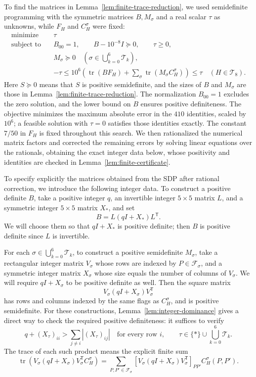 \documentclass[11pt]{article}
\newcommand{\tr}{\operatorname{tr}}
\begin{document}
To find the matrices in Lemma~\ref{lem:finite-trace-reduction}, we used
semidefinite programming with the symmetric matrices $B,M_\sigma$ and a
real scalar $\tau$ as unknowns, while $F_H$ and $C_H^\sigma$ were fixed:
\[
\begin{aligned}
\text{minimize}\quad &\tau\\
\text{subject to}\quad
&B_{00}=1,\qquad B-10^{-8}I\succeq0,\qquad \tau\geq0,\\
&M_\sigma\succeq0
\quad\left(\sigma\in\bigcup_{k=0}^6\mathcal T_k\right),\\
&-\tau\leq10^6\left(\tr(BF_H)
+\sum_\sigma\tr(M_\sigma C_H^\sigma)\right)\leq\tau
\quad(H\in\mathcal T_8).
\end{aligned}
\]
Here $S\succeq0$ means that $S$ is positive semidefinite, and the sizes of
$B$ and $M_\sigma$ are those in Lemma~\ref{lem:finite-trace-reduction}.
The normalization $B_{00}=1$ excludes the zero solution, and the lower
bound on $B$ ensures positive definiteness.
The objective minimizes the maximum absolute error in the $410$ identities,
scaled by $10^6$; a feasible solution with $\tau=0$ satisfies those identities exactly.
The constant $7/50$ in $F_H$ is fixed throughout this search.
We then rationalized the numerical matrix factors and corrected the remaining
errors by solving linear equations over the rationals, obtaining the exact
integer data below, whose positivity and identities are checked in
Lemma~\ref{lem:finite-certificate}.

To specify explicitly the matrices obtained from the SDP after rational
correction, we introduce the following integer data.
To construct a positive definite $B$, take a positive integer $q$, an invertible
integer $5\times5$ matrix $L$, and a symmetric integer $5\times5$ matrix $X_*$,
and set
\[
B=L(qI+X_*)L^{\mathsf T}.
\]
We will choose them so that $qI+X_*$ is positive definite; then $B$ is positive definite since $L$ is invertible.

For each $\sigma\in\bigcup_{k=0}^6\mathcal T_k$, to construct a positive
semidefinite $M_\sigma$, take a rectangular integer matrix $V_\sigma$
whose rows are indexed by $P\in\mathcal F_\sigma$, and a
symmetric integer matrix $X_\sigma$ whose size equals the number of columns
of $V_\sigma$.
We will require $qI+X_\sigma$ to be positive definite as well.
Then the square matrix
\[
V_\sigma(qI+X_\sigma)V_\sigma^{\mathsf T}
\]
has rows and columns indexed by the same flags as $C_H^\sigma$, and is positive semidefinite.
For these constructions, Lemma~\ref{lem:integer-dominance} gives a direct
way to check the required positive definiteness: it suffices to verify
\[
q+(X_\tau)_{ii}>\sum_{j\ne i}|(X_\tau)_{ij}|
\quad\text{for every row }i,
\qquad \tau\in\{*\}\cup\bigcup_{k=0}^6\mathcal T_k.
\]
The trace of each such product means the explicit finite sum
\[
\tr\left(V_\sigma(qI+X_\sigma)V_\sigma^{\mathsf T}C_H^\sigma\right)
=\sum_{P,P'\in\mathcal F_\sigma}
[V_\sigma(qI+X_\sigma)V_\sigma^{\mathsf T}]_{PP'}C_H^\sigma(P,P').
\]
\end{document}
